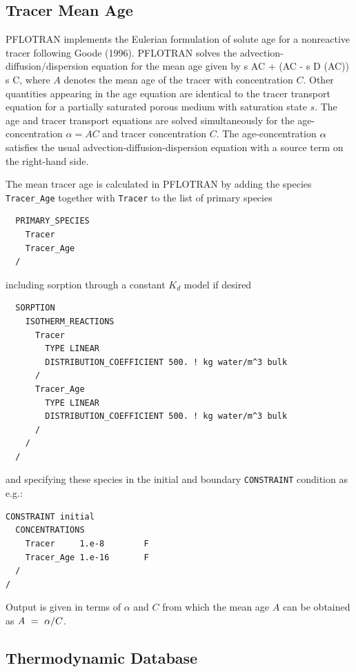 \subsection{Tracer Mean Age}

PFLOTRAN implements the Eulerian formulation of solute age for a nonreactive tracer following Goode (1996). PFLOTRAN solves the advection-diffusion/dispersion equation for the mean age given by
\EQ
{} \varphi s AC + \bnabla\cdot\Big(\bq AC - \varphi s D \bnabla (AC)\Big) \eq \varphi s C,
\EN
where $A$ denotes the mean age of the tracer with concentration $C$. Other quantities appearing in the age equation are identical to the tracer transport equation for a partially saturated porous medium with saturation state $s$. The age and tracer transport equations are solved simultaneously for the age-concentration $\alpha = A C$ and tracer concentration $C$. The age-concentration ${\alpha}$ satisfies the usual advection-diffusion-dispersion equation with a source term on the right-hand side.

The mean tracer age is calculated in PFLOTRAN by adding the species {\tt Tracer\_Age} together with {\tt Tracer} to the list of primary species
\footnotesize
\begin{verbatim}
  PRIMARY_SPECIES
    Tracer
    Tracer_Age
  /
\end{verbatim}
\normalsize
including sorption through a constant $K_d$ model if desired
\footnotesize
\begin{verbatim}
  SORPTION
    ISOTHERM_REACTIONS
      Tracer
        TYPE LINEAR 
        DISTRIBUTION_COEFFICIENT 500. ! kg water/m^3 bulk
      /
      Tracer_Age
        TYPE LINEAR 
        DISTRIBUTION_COEFFICIENT 500. ! kg water/m^3 bulk
      /
    /
  /
\end{verbatim}
\normalsize
and specifying these species in the initial and boundary {\tt CONSTRAINT} condition as e.g.:
\footnotesize
\begin{verbatim}
CONSTRAINT initial
  CONCENTRATIONS
    Tracer     1.e-8        F
    Tracer_Age 1.e-16       F
  /
/
\end{verbatim}
\normalsize
Output is given in terms of $\alpha$ and $C$ from which the mean age $A$ can be obtained as $A\ =\ \alpha/C$. 

\subsection{Thermodynamic Database}
\label{thermo:database}

